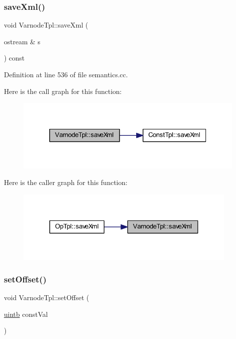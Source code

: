\subsubsection{\texorpdfstring{saveXml()}{saveXml()}}
{\footnotesize\ttfamily void Varnode\+Tpl\+::save\+Xml (\begin{DoxyParamCaption}\item[{ostream \&}]{s }\end{DoxyParamCaption}) const}



Definition at line 536 of file semantics.\+cc.

Here is the call graph for this function\+:
\nopagebreak
\begin{figure}[H]
\begin{center}
\leavevmode
\includegraphics[width=319pt]{class_varnode_tpl_a04f5e3155274e1edf51585d8cd09183c_cgraph}
\end{center}
\end{figure}
Here is the caller graph for this function\+:
\nopagebreak
\begin{figure}[H]
\begin{center}
\leavevmode
\includegraphics[width=306pt]{class_varnode_tpl_a04f5e3155274e1edf51585d8cd09183c_icgraph}
\end{center}
\end{figure}
\mbox{\label{class_varnode_tpl_ad1fec1f52f255bad6d19f6e071ef9742}} 
\subsubsection{\texorpdfstring{setOffset()}{setOffset()}}
{\footnotesize\ttfamily void Varnode\+Tpl\+::set\+Offset (\begin{DoxyParamCaption}\item[{\mbox{\hyperlink{types_8h_a2db313c5d32a12b01d26ac9b3bca178f}{uintb}}}]{const\+Val }\end{DoxyParamCaption})\hspace{0.3cm}{\ttfamily [inline]}}



